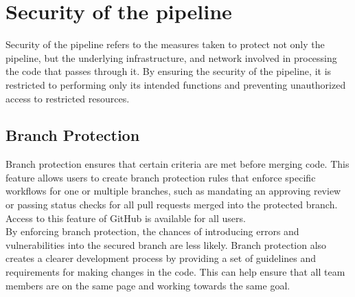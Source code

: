 \section{Security of the pipeline}
\label{Security of the pipeline}
Security of the pipeline refers to the measures taken to protect not only the pipeline, but the underlying infrastructure, and network involved in processing the code that passes through it. By ensuring the security of the pipeline, it is restricted to performing only its intended functions and preventing unauthorized access to restricted resources.  

\subsection{Branch Protection}
Branch protection ensures that certain criteria are met before merging code. This feature allows users to create branch protection rules that enforce specific workflows for one or multiple branches, such as mandating an approving review or passing status checks for all pull requests merged into the protected branch. Access to this feature of GitHub is available for all users.\cite{branch}
\\
By enforcing branch protection, the chances of introducing errors and vulnerabilities into the secured branch are less likely. Branch protection also creates a clearer development process by providing a set of guidelines and requirements for making changes in the code. This can help ensure that all team members are on the same page and working towards the same goal. 


